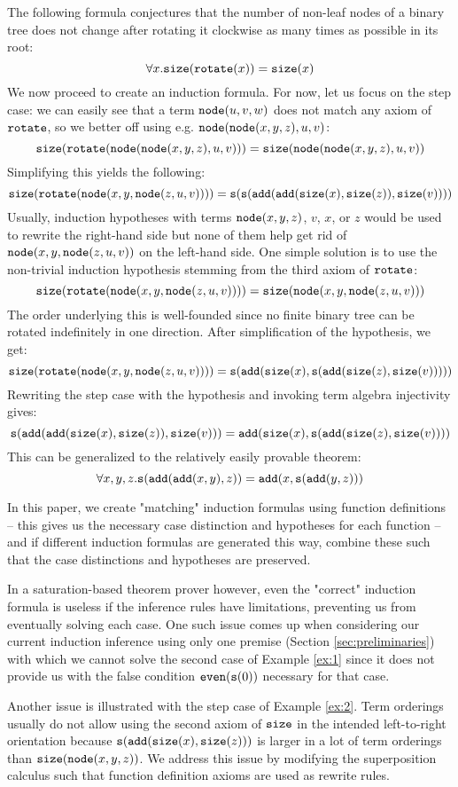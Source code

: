 \begin{example}\label{ex:2}
	The following formula conjectures that the number of non-leaf nodes of a binary tree does not change after rotating it clockwise as many times as possible in its root:
	$$\forall x.\mathtt{size}(\mathtt{rotate}(x))=\mathtt{size}(x)$$
	We now proceed to create an induction formula. For now, let us focus on the step case: we can easily see that a term $\mathtt{node}(u,v,w)$ does not match any axiom of $\mathtt{rotate}$, so we better off using e.g. $\mathtt{node}(\mathtt{node}(x,y,z),u,v)$:
	$$\mathtt{size}(\mathtt{rotate}(\mathtt{node}(\mathtt{node}(x,y,z),u,v)))=\mathtt{size}(\mathtt{node}(\mathtt{node}(x,y,z),u,v))$$
	Simplifying this yields the following:
	$$\mathtt{size}(\mathtt{rotate}(\mathtt{node}(x,y,\mathtt{node}(z,u,v))))=\mathtt{s}(\mathtt{s}(\mathtt{add}(\mathtt{add}(\mathtt{size}(x),\mathtt{size}(z)),\mathtt{size}(v))))$$
	Usually, induction hypotheses with terms $\mathtt{node}(x,y,z)$, $v$, $x$, or $z$ would be used to rewrite the right-hand side but none of them help get rid of $\mathtt{node}(x,y,\mathtt{node}(z,u,v))$ on the left-hand side. One simple solution is to use the non-trivial induction hypothesis stemming from the third axiom of $\mathtt{rotate}$:
	$$\mathtt{size}(\mathtt{rotate}(\mathtt{node}(x,y,\mathtt{node}(z,u,v))))=\mathtt{size}(\mathtt{node}(x,y,\mathtt{node}(z,u,v)))$$
	The order underlying this is well-founded since no finite binary tree can be rotated indefinitely in one direction. After simplification of the hypothesis, we get:
	$$\mathtt{size}(\mathtt{rotate}(\mathtt{node}(x,y,\mathtt{node}(z,u,v))))=\mathtt{s}(\mathtt{add}(\mathtt{size}(x),\mathtt{s}(\mathtt{add}(\mathtt{size}(z),\mathtt{size}(v)))))$$
	Rewriting the step case with the hypothesis and invoking term algebra injectivity gives:
	$$\mathtt{s}(\mathtt{add}(\mathtt{add}(\mathtt{size}(x),\mathtt{size}(z)),\mathtt{size}(v)))=\mathtt{add}(\mathtt{size}(x),\mathtt{s}(\mathtt{add}(\mathtt{size}(z),\mathtt{size}(v))))$$
	This can be generalized to the relatively easily provable theorem:
	$$\forall x,y,z.\mathtt{s}(\mathtt{add}(\mathtt{add}(x,y),z))=\mathtt{add}(x,\mathtt{s}(\mathtt{add}(y,z)))$$
\end{example}

In this paper, we create "matching" induction formulas using function definitions -- this gives us the necessary case distinction and hypotheses for each function -- and if different induction formulas are generated this way, combine these such that the case distinctions and hypotheses are preserved.

In a saturation-based theorem prover however, even the "correct" induction formula is useless if the inference rules have limitations, preventing us from eventually solving each case. One such issue comes up when considering our current induction inference using only one premise (Section \ref{sec:preliminaries}) with which we cannot solve the second case of Example \ref{ex:1} since it does not provide us with the false condition $\mathtt{even}(\mathtt{s}(0))$ necessary for that case.

Another issue is illustrated with the step case of Example \ref{ex:2}. Term orderings usually do not allow using the second axiom of $\mathtt{size}$ in the intended left-to-right orientation because $\mathtt{s}(\mathtt{add}(\mathtt{size}(x),\mathtt{size}(z)))$ is larger in a lot of term orderings than $\mathtt{size}(\mathtt{node}(x,y,z))$. We address this issue by modifying the superposition calculus such that function definition axioms are used as rewrite rules.
